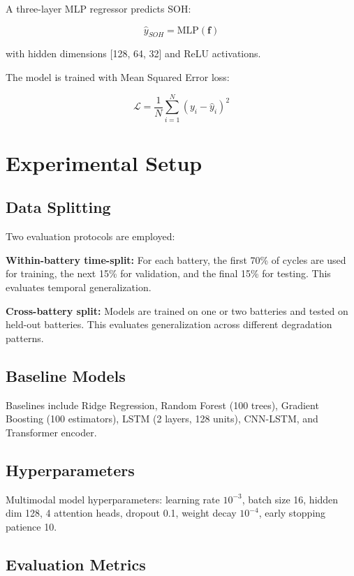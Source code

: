 \documentclass[conference]{IEEEtran}
\begin{document}
A three-layer MLP regressor predicts SOH:

\begin{equation}
    \hat{y}_{SOH} = \text{MLP}(\mathbf{f})
\end{equation}

with hidden dimensions [128, 64, 32] and ReLU activations.

The model is trained with Mean Squared Error loss:

\begin{equation}
    \mathcal{L} = \frac{1}{N}\sum_{i=1}^{N}(y_i - \hat{y}_i)^2
\end{equation}

\section{Experimental Setup}

\subsection{Data Splitting}

Two evaluation protocols are employed:

\textbf{Within-battery time-split:} For each battery, the first 70\% of cycles are used for training, the next 15\% for validation, and the final 15\% for testing. This evaluates temporal generalization.

\textbf{Cross-battery split:} Models are trained on one or two batteries and tested on held-out batteries. This evaluates generalization across different degradation patterns.

\subsection{Baseline Models}

Baselines include Ridge Regression, Random Forest (100 trees), Gradient Boosting (100 estimators), LSTM (2 layers, 128 units), CNN-LSTM, and Transformer encoder.

\subsection{Hyperparameters}

Multimodal model hyperparameters: learning rate $10^{-3}$, batch size 16, hidden dim 128, 4 attention heads, dropout 0.1, weight decay $10^{-4}$, early stopping patience 10.

\subsection{Evaluation Metrics}
\end{document}
